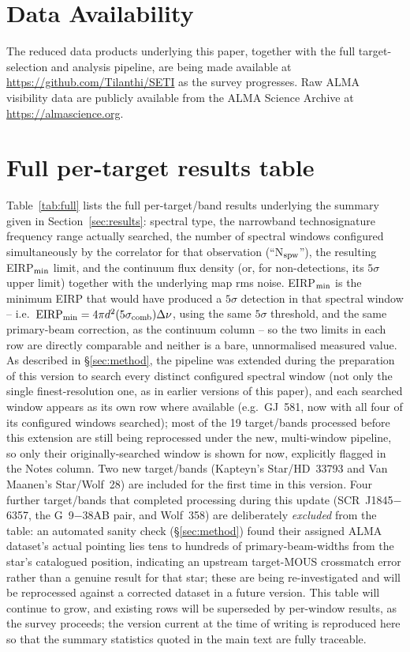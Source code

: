 \documentclass{openjournal}
\begin{document}
\section*{Data Availability}
The reduced data products underlying this paper, together with the full
target-selection and analysis pipeline, are being made available at
\url{https://github.com/Tilanthi/SETI} as the survey progresses. Raw ALMA
visibility data are publicly available from the ALMA Science Archive at
\url{https://almascience.org}.


\appendix
\section{Full per-target results table}
\label{app:table}

Table~\ref{tab:full} lists the full per-target/band results underlying the
summary given in Section~\ref{sec:results}: spectral type, the narrowband
technosignature frequency range actually searched, the number of spectral
windows configured simultaneously by the correlator for that observation
(``N$_{\rm spw}$''), the resulting EIRP$_{\rm min}$ limit, and the
continuum flux density (or, for non-detections, its $5\sigma$ upper
limit) together with the underlying map rms noise. EIRP$_{\rm min}$ is
the minimum EIRP that would have produced a $5\sigma$ detection in that
spectral window -- i.e.\ $\mathrm{EIRP_{min}} = 4\pi d^{2}(5\sigma_{\rm
comb})\Delta\nu$, using the same $5\sigma$ threshold, and the same
primary-beam correction, as the continuum column -- so the two limits in
each row are directly comparable and neither is a bare, unnormalised
measured value. As described in \S\ref{sec:method}, the pipeline was
extended during the preparation of this version to search every distinct
configured spectral window (not only the single finest-resolution one, as
in earlier versions of this paper), and each searched window appears as
its own row where available (e.g.\ GJ~581, now with all four of its
configured windows searched); most of the 19 target/bands processed
before this extension are still being reprocessed under the new,
multi-window pipeline, so only their originally-searched window is shown
for now, explicitly flagged in the Notes column. Two new target/bands
(Kapteyn's Star/HD~33793 and Van Maanen's Star/Wolf~28) are included for
the first time in this version. Four further target/bands that completed
processing during this update (SCR~J1845$-$6357, the G~9$-$38AB pair, and
Wolf~358) are deliberately \emph{excluded} from the table: an automated
sanity check (\S\ref{sec:method}) found their assigned ALMA dataset's
actual pointing lies tens to hundreds of primary-beam-widths from the
star's catalogued position, indicating an upstream target-MOUS
crossmatch error rather than a genuine result for that star; these are
being re-investigated and will be reprocessed against a corrected
dataset in a future version. This table will continue to grow, and
existing rows will be superseded by per-window results, as the survey
proceeds; the version current at the time of writing is reproduced here
so that the summary statistics quoted in the main text are fully
traceable.
\end{document}
